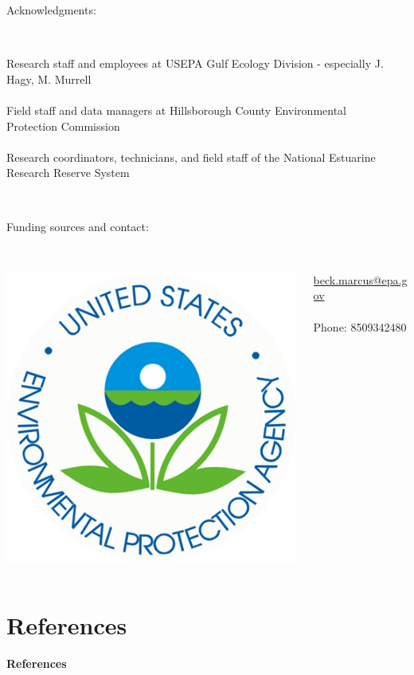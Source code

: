 \documentclass[serif]{beamer}\usepackage[]{graphicx}\usepackage[]{color}
\begin{document}
\begin{frame}
Acknowledgments:\\~\\
\begin{columns}
\begin{column}{0.8\textwidth}
{\footnotesize
Research staff and employees at USEPA Gulf Ecology Division - especially J. Hagy, M. Murrell\\~\\
Field staff and data managers at Hillsborough County Environmental Protection Commission\\~\\
Research coordinators, technicians, and field staff of the National Estuarine Research Reserve System}\\~\\
\end{column}
\begin{column}{0.2\textwidth}
\end{column}
\end{columns}
\vfill
Funding sources and contact:\\~\\
\begin{columns}
\begin{column}{0.5\textwidth}
\centerline{\includegraphics[width=0.4\linewidth]{fig/epa_logo.png}}
\end{column}
\begin{column}{0.5\textwidth}
\scriptsize
\href{mailto:beck.marcus@epa.gov}{beck.marcus@epa.gov} \\~\\
Phone: 8509342480
\end{column}
\end{columns}
\vspace{0.2in}
\end{frame}

\section{References}
\begin{frame}[allowframebreaks,t]{\textbf{References}}
\tiny
{}


\end{frame}
\end{document}
